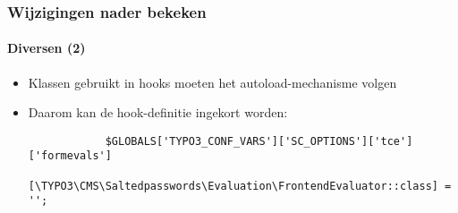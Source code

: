 \begin{frame}[fragile]
	\frametitle{Wijzigingen nader bekeken}
	\framesubtitle{Diversen (2)}

	\lstset{basicstyle=\tiny\ttfamily}

	\begin{itemize}

		\item Klassen gebruikt in hooks moeten het autoload-mechanisme volgen
		\item Daarom kan de hook-definitie ingekort worden:

		\begin{lstlisting}
			$GLOBALS['TYPO3_CONF_VARS']['SC_OPTIONS']['tce']['formevals']
			  [\TYPO3\CMS\Saltedpasswords\Evaluation\FrontendEvaluator::class] = '';
		\end{lstlisting}

	\end{itemize}

	\breakingchange

\end{frame}


